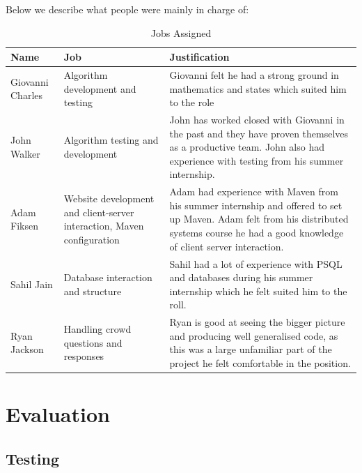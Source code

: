 \documentclass[11pt]{article}
\begin{document}
Below we describe what people were mainly in charge of:


\begin{table}[H]
\caption{Jobs Assigned}
\begin{center}
\begin{tabular}{|p{2cm}|p{5cm}|p{7cm}|}
Name & Job & Justification\\
\hline

Giovanni Charles & Algorithm development and testing                                       &
Giovanni felt he had a strong ground in mathematics and states which suited him to the role
\\ 
John Walker      & Algorithm testing and development                                       &
John has worked closed with Giovanni in the past and they have proven themselves as a productive team.
John also had experience with testing from his summer internship. 
\\
Adam Fiksen      & Website development and client-server interaction, Maven configuration  &
Adam had experience with Maven from his summer internship and offered to set up Maven. Adam
felt from his distributed systems course he had a good knowledge of client server interaction.
\\
Sahil Jain       & Database interaction and structure                                      &
Sahil had a lot of experience with PSQL and databases during his summer internship which he felt
suited him to the roll.
\\
Ryan Jackson     & Handling crowd questions and responses                                  &
Ryan is good at seeing the bigger picture and producing well generalised code, as this was a large
unfamiliar part of the project he felt comfortable in the position.
\\

\end{tabular}
\end{center}
\label{jobs}
\end{table}

\section{Evaluation}
\subsection{Testing}
\end{document}
